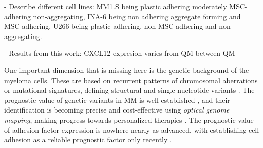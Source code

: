 



% 

\unnsubsection{\cadddiversitytitle}%
\label{sec:discussion_cadddiversity}%

- Describe different cell lines: MM1.S being plastic adhering moderately
MSC-adhering non-aggregating, INA-6 being non adhering aggregate forming and
MSC-adhering, U266 being plastic adhering, non MSC-adhering and
non-aggregating.

- Results from this work: CXCL12 expresion varies from QM between QM

One important dimension that is missing here is the genetic background of the
myeloma cells. These are based on recurrent patterns of chromosomal aberrations
or mutational signatures, defining structural and single nucleotide variants
\cite{kumarMultipleMyelomasCurrent2018a,
      hoangMutationalProcessesContributing2019}. The prognostic value of genetic
variants in MM is well established \cite{sharmaPrognosticRoleMYC2021}, and their
identification is becoming precise and cost-effective using \emph{optical
      genome mapping}, making progress towards personalized therapies
\cite{zouComprehensiveApproachEvaluate2024,
      budurleanIntegratingOpticalGenome2024}. The prognostic value of adhesion factor
expression is nowhere nearly as advanced, with establishing cell adhesion as a
reliable prognostic factor only recently
\cite{huDevelopmentCellAdhesionbased2024}.

